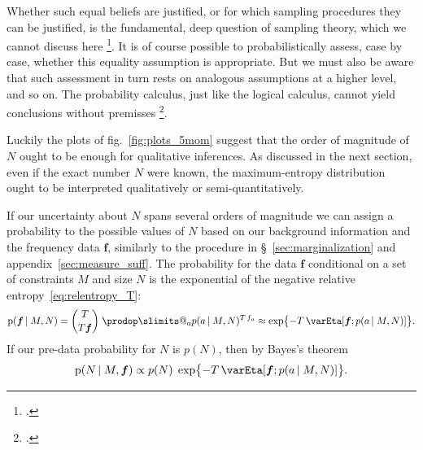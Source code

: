 \documentclass[\ifafour a4paper,12pt,\else a5paper,10pt,\fi%
onecolumn,oneside,article,%
british%
]{memoir}
\makeatletter
\theoremstyle{remark}
\theoremstyle{innote}
\def\prod{\DOTSI\prodop\slimits@}
\newcommand*{\citep}{\footcites}
\newcommand*{\pf}{\mathrm{p}}%
\renewcommand*{\|}{\nonscript\,\vert\nonscript\;\mathopen{}}
\newcommand*{\sect}{\S}%
\newcommand*{\fig}{fig.}%
\newcommand*{\eg}{{e.g.}}
\newcommand*{\yav}{a}
\newcommand*{\yff}{f}
\newcommand*{\yf}{\bm{\yff}}
\newcommand*{\ya}{\yav}%
\newcommand*{\pxx}{p}
\newcommand*{\sh}{\mathrm{\varEta}}
\makeatother
\begin{document}
Whether such equal beliefs are justified, or for which sampling procedures
they can be justified, is the fundamental, deep question of sampling
theory, which we cannot discuss here \citep[see \eg\ the discussions,
reviews, and references
in][]{ericson1969,smith1976,kruskaletal1979c,kruskaletal1980}. It is of
course possible to probabilistically assess, case by case, whether this
equality assumption is appropriate. But we must also be aware that such
assessment in turn rests on analogous assumptions at a higher level, and so
on. The probability calculus, just like the logical calculus, cannot yield
conclusions without premisses \citep[p.~182]{johnson1924}.

Luckily the plots of \fig~\ref{fig:plots_5mom} suggest that the order of
magnitude of $N$ ought to be enough for qualitative inferences. As
discussed in the next section, even if the exact number $N$ were known, the
maximum-entropy distribution ought to be interpreted qualitatively or
semi-quantitatively.

If our uncertainty about $N$ spans several orders of magnitude we can
assign a probability to the possible values of $N$ based on our background
information and the frequency data $\yf$, similarly to the procedure in
\sect~\ref{sec:marginalization} and appendix~\ref{sec:measure_suff}. The
probability for the data $\yf$ conditional on a set of constraints $M$ and
size $N$ is the exponential of the negative relative
entropy~\eqref{eq:relentropy_T}:
\begin{equation}
  \label{eq:prob_data_from_N}
  \pf(\yf \| M, N) = \binom{T}{T\yf}\;\prod_{a}\pxx(\ya \| M, N)^{T\,\yff_{a}}
  \approx \exp\bigl\{  -T\,\sh[\yf; \pxx(\ya \| M, N)]\bigr\}.
\end{equation}
If our pre-data probability for $N$ is $p(N)$, then by Bayes's theorem
\begin{equation}
  \label{eq:prob_N_from_data}
  \pf(N \| M, \yf) \propto
  p(N)\;\exp\bigl\{-T\,\sh[\yf; \pxx(\ya \| M, N)]\bigr\}.
\end{equation}
\end{document}
